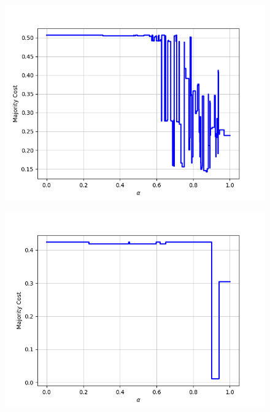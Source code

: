 \begin{figure}[h]
\begin{minipage}{.24\textwidth}
  {\includegraphics[width=\linewidth]{plots/nell-sc/vertebrate}}
\end{minipage}
\begin{minipage}{.24\textwidth}
  \centering
  {\includegraphics[width=\linewidth]{plots/nell-sc/visualizableattribute}}
\end{minipage}
\begin{minipage}{.24\textwidth}
  \centering

\end{minipage}
\end{figure}
